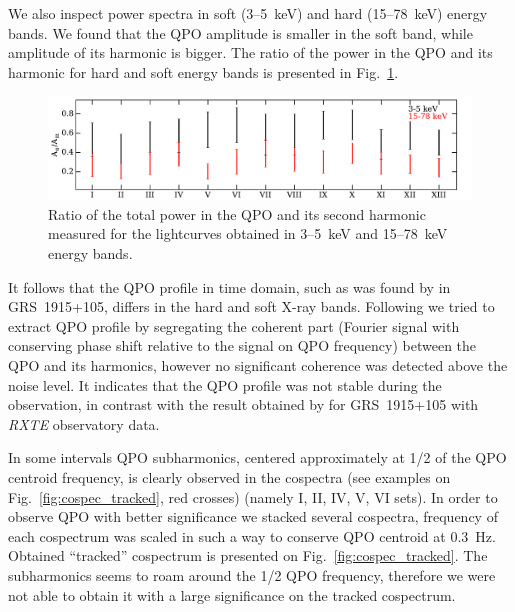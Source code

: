 \documentclass[a4paper,fleqn,usenatbib]{mnras}
\begin{document}
We also inspect power spectra in soft (3--5~keV) and hard (15--78~keV) energy bands.
We found that the QPO amplitude is smaller in the soft band, while amplitude of its harmonic is bigger.
The ratio of the power in the QPO and its harmonic for hard and soft energy bands is presented in Fig.~\ref{fig:qpo_ratio}.
\begin{figure}
\includegraphics[width=\columnwidth]{QPO_and_harmonic_ratio_ylabel.pdf}
        \caption{Ratio of the total power in the QPO and its second harmonic measured for the lightcurves obtained in 3--5~keV and 15--78~keV energy bands.}
        \label{fig:qpo_ratio}
\end{figure}
It follows that the QPO profile in time domain, such as was found by \citet{2015MNRAS.446.3516I} in GRS~1915+105, differs in the hard and soft X-ray bands.
Following \citet{2015MNRAS.446.3516I} we tried to extract QPO profile by segregating the coherent part (Fourier signal with conserving phase shift relative to the signal on QPO frequency) between the QPO and its harmonics, however no significant coherence was detected above the noise level.
It indicates that the QPO profile was not stable during the observation, in contrast with the result obtained by \citet{2015MNRAS.446.3516I} for GRS~1915+105 with {\it RXTE} observatory data.

In some intervals QPO subharmonics, centered approximately at 1/2 of the QPO centroid frequency, is clearly observed in the cospectra (see examples on Fig.~\ref{fig:cospec_tracked}, red crosses) (namely I, II, IV, V, VI sets).
In order to observe QPO with better significance we stacked several cospectra, frequency of each cospectrum was scaled in such a way to conserve QPO centroid at 0.3~Hz.
Obtained ``tracked'' cospectrum is presented on Fig.~\ref{fig:cospec_tracked}.
The subharmonics seems to roam around the 1/2 QPO frequency, therefore we were not able to obtain it with a large significance on the tracked cospectrum.
\end{document}
